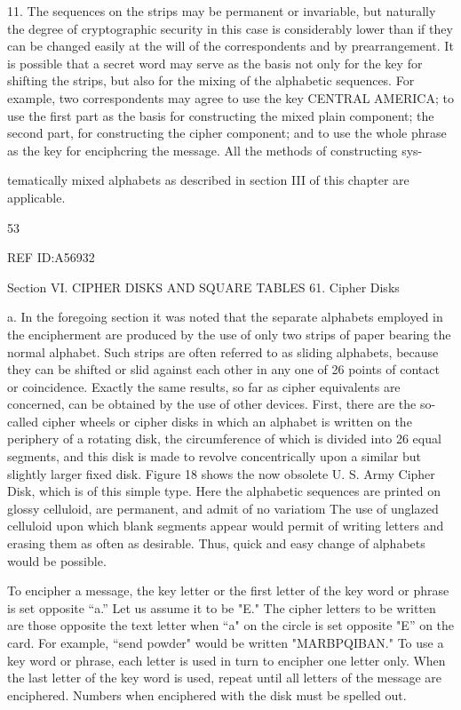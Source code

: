 {11. The sequences on the strips may be permanent or invariable, but
naturally the degree of cryptographic security in this case is considerably
lower than if they can be changed easily at the will of the correspondents
and by prearrangement. It is possible that a secret word may serve as
the basis not only for the key for shifting the strips, but also for the
mixing of the alphabetic sequences. For example, two correspondents
may agree to use the key CENTRAL AMERICA; to use the ﬁrst part
as the basis for constructing the mixed plain component; the second part,
for constructing the cipher component; and to use the whole phrase as
the key for enciphcring the message. All the methods of constructing sys-

tematically mixed alphabets as described in section III of this chapter
are applicable.

53

 

 

 

 

 

REF ID:A56932

Section VI. CIPHER DISKS AND SQUARE TABLES
61. Cipher Disks

a. In the foregoing section it was noted that the separate alphabets
employed in the encipherment are produced by the use of only two strips
of paper bearing the normal alphabet. Such strips are often referred to
as sliding alphabets, because they can be shifted or slid against each other
in any one of 26 points of contact or coincidence. Exactly the same
results, so far as cipher equivalents are concerned, can be obtained by the
use of other devices. First, there are the so-called cipher wheels or cipher
disks in which an alphabet is written on the periphery of a rotating disk,
the circumference of which is divided into 26 equal segments, and this
disk is made to revolve concentrically upon a similar but slightly larger
ﬁxed disk. Figure 18 shows the now obsolete U. S. Army Cipher Disk,
which is of this simple type. Here the alphabetic sequences are printed
on glossy celluloid, are permanent, and admit of no variatiom The
use of unglazed celluloid upon which blank segments appear would
permit of writing letters and erasing them as often as desirable. Thus,
quick and easy change of alphabets would be possible.

 

To encipher a message, the key letter or the ﬁrst letter of the
key word or phrase is set opposite “a.” Let us assume it
to be "E." The cipher letters to be written are those
opposite the text letter when “a" on the circle is set
opposite "E” on the card. For example, “send powder"
would be written "MARBPQIBAN." To use a key word
or phrase, each letter is used in turn to encipher one letter
only. When the last letter of the key word is used, repeat
until all letters of the message are enciphered. Numbers
when enciphered with the disk must be spelled out.

}

